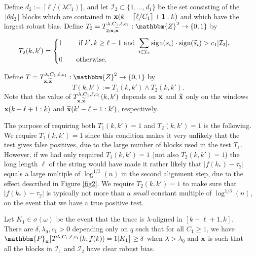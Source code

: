 \documentclass[final,12pt]{colt2018} %
\newcommand{\Z}{\mathbbm{Z}}
\renewcommand{\P}{\mathbbm{P}}
\newcommand{\1}{\mathbf{1}}
\def\cI{\mathcal{I}}
\newcommand{\eqbn}{\begin{equation*}}
\newcommand{\eqen}{\end{equation*}}
\newcommand{\op}{\operatorname}
\newcommand{\wt}{\widetilde}
\newcommand{\mcl}{\mathcal}
\def\xt{{\wt {\bf x}}}
\def\x{{\bf x}}
\begin{document}
Define $d_2 := \lceil \ell / (\lambda C_1) \rceil$,
and let $\cI_2 \subset \{1 , \dots , d_1 \}$ be the set consisting
of the $\lceil \theta d_2 \rceil$ blocks which are contained in
$\x(k - \lceil \ell / C_1 \rceil + 1 : k)$ and which have the
largest robust bias.  Define
$T_2 = T^{\lambda , C_1 , \ell,c_1}_{2 ; \x , \xt} : \Z^2\to\{0,1 \}$ by
\eqbn
T_2(k,k') =
\begin{cases}
	1 \qquad \displaystyle\text{\,\,if\,\,} k' , k \geq \ell - 1
	\text{\,\,and\,\,} \sum_{i\in\mcl I_2}
	\op{sign}(s_i) \cdot \op{sign}(\wt s_i) > c_1 |\mcl I_2|,\\
	0 \qquad\text{otherwise}.
\end{cases}
\eqen
\begin{definition} \label{def10}
	Define $T = T^{\lambda , C_1 , \ell,c_1}_{\x , \xt} : \Z^2 \to \{0 , 1 \}$ by
	$$T(k,k'):=T_1(k,k')\wedge T_2(k,k').$$
	Note that the value of $T^{\lambda,C_1,\ell,c_1}_{\x,\xt}(k,k')$ depends
	on $\x$ and $\xt$ only on the windows $\x(k - \ell + 1 : k)$
	and $\xt(k' - \ell + 1 : k')$, respectively.
\end{definition}
The purpose of requiring both $T_1(k,k')=1$ and $T_2(k,k')=1$ is the following. We require $T_1(k,k')=1$ since this condition makes it very unlikely that the test gives false positives, due to the large number of blocks used in the test $T_1$. However, if we had only required $T_1(k,k')=1$ (not also $T_2(k,k')=1$) the long length $\ell$ of the string would have made it rather likely that $|f(k_*)-\tau_2|$ equals a large multiple of $\log^{1/3}(n)$ in the second alignment step, due to the effect described in Figure \ref{fig2}. We require $T_2(k,k')=1$ to make sure that $|f(k_*)-\tau_2|$ is typically not more than a \emph{small} constant multiple of $\log^{1/3}(n)$, on the event that we have a true positive test.
\begin{lemma} \label{lem:c}
	Let $K_1 \in \sigma (\omega)$ be the event that the trace is
	$\lambda$-aligned in $[k - \ell + 1 , k]$.
	There are $\delta , \lambda_0,c_1 > 0$ depending only on $q$ such that for all $C_1\geq 1$, we have
	$\P_\x \big[T^{\lambda,C_1,\ell,c_1}(k,f(k)) = 1 | K_1\big] \geq \delta$ when $\lambda > \lambda_0$
	and $\x$ is such that all the blocks in $\cI_1$ and $\cI_2$ have clear
	robust bias.
\end{lemma}
\end{document}
